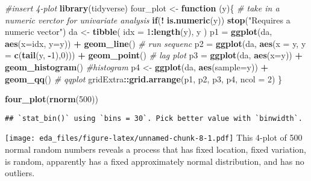 \documentclass[]{book}
\newenvironment{Shaded}{\begin{snugshade}}{\end{snugshade}}
\newcommand{\KeywordTok}[1]{\textcolor[rgb]{0.13,0.29,0.53}{\textbf{#1}}}
\newcommand{\DataTypeTok}[1]{\textcolor[rgb]{0.13,0.29,0.53}{#1}}
\newcommand{\DecValTok}[1]{\textcolor[rgb]{0.00,0.00,0.81}{#1}}
\newcommand{\StringTok}[1]{\textcolor[rgb]{0.31,0.60,0.02}{#1}}
\newcommand{\CommentTok}[1]{\textcolor[rgb]{0.56,0.35,0.01}{\textit{#1}}}
\newcommand{\ControlFlowTok}[1]{\textcolor[rgb]{0.13,0.29,0.53}{\textbf{#1}}}
\newcommand{\OperatorTok}[1]{\textcolor[rgb]{0.81,0.36,0.00}{\textbf{#1}}}
\newcommand{\NormalTok}[1]{#1}
\theoremstyle{definition}
\theoremstyle{definition}
\theoremstyle{definition}
\theoremstyle{remark}
\begin{document}
\begin{Shaded}
\begin{Highlighting}[]
\CommentTok{#insert 4-plot}
\KeywordTok{library}\NormalTok{(tidyverse)}
\NormalTok{four_plot <-}\StringTok{ }\ControlFlowTok{function}\NormalTok{ (y)\{}
  \CommentTok{# take in a numeric verctor for univariate analysis}
  \ControlFlowTok{if}\NormalTok{(}\OperatorTok{!}\StringTok{ }\KeywordTok{is.numeric}\NormalTok{(y)) }\KeywordTok{stop}\NormalTok{(}\StringTok{"Requires a numeric vector"}\NormalTok{)}
\NormalTok{  da <-}\StringTok{ }\KeywordTok{tibble}\NormalTok{( }\DataTypeTok{idx =} \DecValTok{1}\OperatorTok{:}\KeywordTok{length}\NormalTok{(y), y )}
\NormalTok{  p1 =}\StringTok{ }\KeywordTok{ggplot}\NormalTok{(da, }\KeywordTok{aes}\NormalTok{(}\DataTypeTok{x=}\NormalTok{idx, }\DataTypeTok{y=}\NormalTok{y)) }\OperatorTok{+}\StringTok{ }\KeywordTok{geom_line}\NormalTok{() }\CommentTok{# run sequenc}
\NormalTok{  p2 =}\StringTok{ }\KeywordTok{ggplot}\NormalTok{(da, }\KeywordTok{aes}\NormalTok{(}\DataTypeTok{x =}\NormalTok{ y, }\DataTypeTok{y =} \KeywordTok{c}\NormalTok{(}\KeywordTok{tail}\NormalTok{(y, }\OperatorTok{-}\DecValTok{1}\NormalTok{),}\DecValTok{0}\NormalTok{))) }\OperatorTok{+}\StringTok{ }\KeywordTok{geom_point}\NormalTok{() }\CommentTok{# lag plot}
\NormalTok{  p3 =}\StringTok{ }\KeywordTok{ggplot}\NormalTok{(da, }\KeywordTok{aes}\NormalTok{(}\DataTypeTok{x=}\NormalTok{y)) }\OperatorTok{+}\StringTok{ }\KeywordTok{geom_histogram}\NormalTok{() }\CommentTok{#histogram}
\NormalTok{  p4 <-}\StringTok{ }\KeywordTok{ggplot}\NormalTok{(da, }\KeywordTok{aes}\NormalTok{(}\DataTypeTok{sample=}\NormalTok{y)) }\OperatorTok{+}\StringTok{ }\KeywordTok{geom_qq}\NormalTok{() }\CommentTok{# qqplot}
\NormalTok{  gridExtra}\OperatorTok{::}\KeywordTok{grid.arrange}\NormalTok{(p1, p2, p3, p4, }\DataTypeTok{ncol =} \DecValTok{2}\NormalTok{)}
\NormalTok{\}}

\KeywordTok{four_plot}\NormalTok{(}\KeywordTok{rnorm}\NormalTok{(}\DecValTok{500}\NormalTok{))}
\end{Highlighting}
\end{Shaded}

\begin{verbatim}
## `stat_bin()` using `bins = 30`. Pick better value with `binwidth`.
\end{verbatim}

\texttt{[image: eda\_files/figure-latex/unnamed-chunk-8-1.pdf]} This
4-plot of 500 normal random numbers reveals a process that has fixed
location, fixed variation, is random, apparently has a fixed
approximately normal distribution, and has no outliers.
\end{document}
